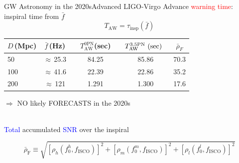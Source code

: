 \documentclass[xcolor=dvipsnames,t]{beamer}
\newcommand{\red}[1]{\textcolor{red}{#1}}
\newcommand{\bl}[1]{\textcolor{blue}{#1}}
\newcommand\T{\rule{0pt}{2.6ex}}       %
\newcommand\B{\rule[-1.2ex]{0pt}{0pt}} %
\begin{document}
\begin{frame}{GW Astronomy in the 2020s}{Advanced LIGO-Virgo}
  Advance \red{warning time}: inspiral time from $\bar{f}$
  \[
    T_\text{AW} = \tau_\text{insp}(\bar{f})
  \]
  \begin{footnotesize}
         \begin{table}[h]
	\centering
	\begin{tabular}{lcccccc}
	  \hline\hline
	  $D\,$(Mpc) & $\bar{f}\,$(Hz) &{}& $T^\text{0PN}_\text{AW}$(sec) &\hspace{1mm} & $T^\text{3.5PN}_\text{AW}\text{ (sec)}\hspace{2mm}$& $\bar{\rho}_F$\T \B \\
	  \hline
	  50 & $\approx\,$25.3 & & 84.25 & & 85.86 & 70.3 \\
	  100 & $\approx\,$41.6 & & 22.39 & & 22.86 & 35.2 \\
	  200 & $\approx\,$121 & & 1.291 &\quad & 1.300 & 17.6 \\
	  \hline\hline
	\end{tabular}
      \end{table}
  \end{footnotesize}
  $\Longrightarrow$ NO likely FORECASTS  in the 2020s
  \\
  \vspace{2mm}
      \bl{Total} accumulated \bl{SNR} over the inspiral
    \begin{footnotesize}
      \[
      \bar{\rho}_\text{F}\equiv\sqrt{\left[{\rho}_h(f_0^h,{f}_\text{ISCO})\right]^2+\left[{\rho}_m(f_0^m,{f}_\text{ISCO})\right]^2+\left[{\rho}_l(f_0^l,{f}_\text{ISCO})\right]^2}
      \]
    \end{footnotesize}
\end{frame}
\end{document}
